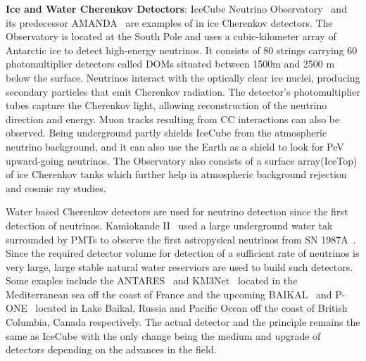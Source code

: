 \begin{description}
  \item \textbf{Ice and Water Cherenkov Detectors}: IceCube Neutrino Observatory~\cite{} and its predecessor AMANDA~\cite{} are examples of in ice Cherenkov detectors. The Observatory is located at the South Pole and uses a cubic-kilometer array of Antarctic ice to detect high-energy neutrinos. It consists of 80 strings carrying 60 photomultiplier detectors called DOMs situated between 1500m and 2500 m below the surface. Neutrinos interact with the optically clear ice nuclei, producing secondary particles that emit Cherenkov radiation. The detector's photomultiplier tubes capture the Cherenkov light, allowing reconstruction of the neutrino direction and energy. Muon tracks resulting from CC interactions can also be observed. Being underground partly shields IceCube from the atmospheric neutrino background, and it can also use the Earth as a shield to look for PeV upward-going neutrinos. The Observatory also consists of a surface array(IceTop) of ice Cherenkov tanks which further help in atmospheric background rejection and cosmic ray studies. 
  
  Water based Cherenkov detectors are used for neutrino detection since the first detection of neutrinos. Kamiokande II~\cite{} used a large underground water tak surrounded by PMTs to observe the first astropysical neutrinos from SN 1987A~\cite{}. Since the required detector volume for detection of a sufficient rate of neutrinos is very large, large stable natural water reserviors are used to build such detectors. Some exaples include the ANTARES~\cite{} and KM3Net~\cite{} located in the Mediterranean sea off the coast of France and the upcoming BAIKAL~\cite{} and P-ONE~\cite{} located in Lake Baikal, Russia and  Pacific Ocean off the coast of British Columbia, Canada respectively. The actual detector and the principle remains the same as IceCube with the only change being the medium and upgrade of detectors depending on the advances in the field. 
  

\end{description}
